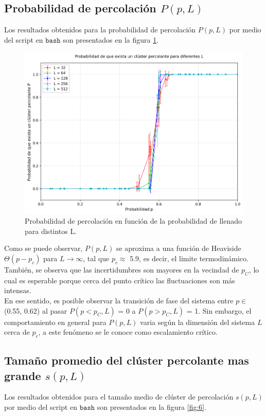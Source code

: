 \documentclass[12pt,a4paper]{article}
\begin{document}
\subsection{Probabilidad de percolación $P(p,L)$}

Los resultados obtenidos para la probabilidad de percolación $P(p,L)$ por medio del script en $\texttt{bash}$ son presentados en la figura \ref{fig:5}.

\begin{figure}[H]
    \centering
   \includegraphics[width=0.75\linewidth]{../figures/P_all_L.png}
   \caption{Probabilidad de percolación en función de la probabilidad de llenado para distintos L.}
    \label{fig:5}
\end{figure}

Como se puede observar, $P(p,L)$ se aproxima a una función de Heaviside $\Theta(p-p_c)$ para $L\rightarrow\infty$, tal que $p_c\approx$ 5.9, es decir, el limite termodinámico. También, se observa que las incertidumbres son mayores en la vecindad de $p_C$, lo cual es esperable porque cerca del punto crítico las fluctuaciones son más intensas.
\\

En ese sentido, es posible observar la transición de fase del sistema entre $p\in$(0.55, 0.62) al pasar $P(p<p_C,L)$ = 0 a $P(p>p_C,L)$ = 1. Sin embargo, el comportamiento en general para $P(p,L)$ varia según la dimensión del sistema $L$ cerca de $p_c$, a este fenómeno se le conoce como escalamiento crítico.

\subsection{Tamaño promedio del clúster percolante mas grande $s(p,L)$}

Los resultados obtenidos para el tamaño medio de clúster de percolación $s(p,L)$ por medio del script en $\texttt{bash}$ son presentados en la figura \ref{fig:6}.
\end{document}

